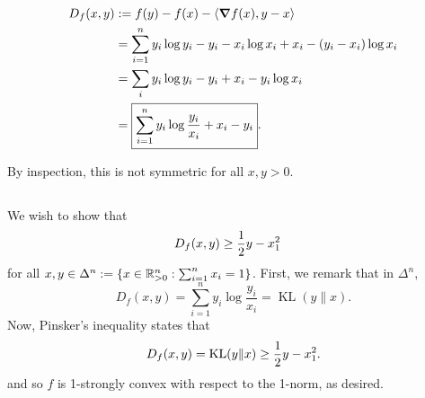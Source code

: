 \documentclass[10pt]{article}
\DeclarePairedDelimiter{\set}{\lbrace}{\rbrace}
\DeclarePairedDelimiter{\iprod}{\langle}{\rangle}
\let\norm\relax
\DeclarePairedDelimiter{\norm}{\lVert}{\rVert}
\DeclareMathOperator{\KL}{KL}
\newcommand{\R}{\mathbb{R}}
\begin{document}
\subsection{}
\begin{align*}
  D_f(x, y)
  &:= f(y) - f(x) - \iprod{\grad f(x), y-x} \\
&= \sum_{i=1}^n y_i\log y_i- y_i - x_i\log x_i + x_i - (y_i-x_i)\log x_i \\
  &= \sum_i y_i\log y_i- y_i + x_i - y_i \log x_i \\
  &= \boxed{\sum_{i=1}^n y_i \log \frac{y_i}{x_i} + x_i - y_i}.
\end{align*}

By inspection,
this is not symmetric for all $x, y > 0$.

\subsection{}
We wish to show that
\begin{align*}
  D_f(x, y) &\geq \frac12 \norm{y-x}_1^2
\end{align*}
for all $x, y\in \Delta^n := \set{x\in \R_{>0}^n: \sum_{i=1}^n x_i = 1}$.
First,
we remark that in $\Delta^n$,
\[
  D_f(x, y) = \sum_{i=1}^n y_i \log \frac{y_i}{x_i}
  = \KL(y\| x).
\]
Now,
Pinsker's inequality states that
\[
  D_f(x, y) = \KL(y\| x)\geq \frac12 \norm{y-x}_1^2.
\]
and so $f$ is 1-strongly convex with respect to the 1-norm,
as desired.

\clearpage
\section{}
\subsection{}
\subsection{}
\subsection{}
\subsection{}
\subsection{}
\end{document}
